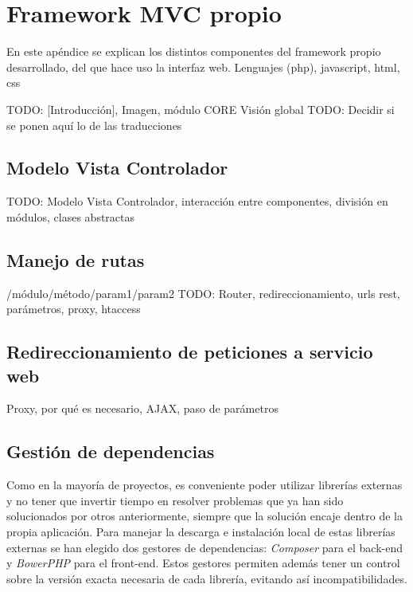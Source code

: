 \chapter{Framework MVC propio\label{extra:framework_mvc_propio}}

En este apéndice se explican los distintos componentes del \gls{framework} propio desarrollado, del que hace uso la interfaz web. 
Lenguajes (php), javascript, html, css

TODO: [Introducción], Imagen, módulo CORE
  {Visión global}
TODO: Decidir si se ponen aquí lo de las traducciones

\section{Modelo Vista Controlador\label{extra:mvc:mvc}}

TODO: Modelo Vista Controlador, interacción entre componentes, división en módulos,
clases abstractas

\section{Manejo de rutas\label{extra:mvc:router}}

/módulo/método/param1/param2
TODO: Router, redireccionamiento, urls rest, parámetros, proxy, htaccess

\section{Redireccionamiento de peticiones a servicio web\label{extra:mvc:proxy}}

Proxy, por qué es necesario, AJAX, paso de parámetros

\section{Gestión de dependencias\label{extra:mvc:dependencias}}

Como en la mayoría de proyectos, es conveniente poder utilizar librerías externas y no tener que invertir tiempo en resolver problemas que ya han sido solucionados por otros anteriormente, siempre que la solución encaje dentro de la propia aplicación. Para manejar la descarga e instalación local de estas librerías externas se han elegido dos gestores de dependencias: \textit{Composer} \cite{composer} para el \gls{back-end} y \textit{BowerPHP} \cite{bowerphp} para el \gls{front-end}. Estos gestores permiten además tener un control sobre la versión exacta necesaria de cada librería, evitando así incompatibilidades.

